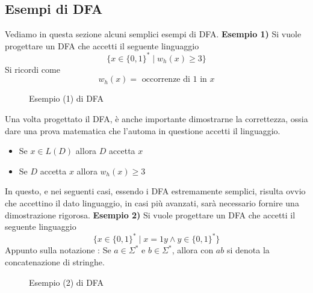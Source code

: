 \documentclass[10pt, letterpaper]{report}
\begin{document}
\subsection{Esempi di DFA}
Vediamo in questa sezione alcuni semplici esempi di DFA.\acc 
\textbf{Esempio 1)} Si vuole progettare un DFA che accetti il seguente linguaggio 
$$ \{x\in\{0,1\}^* \;|\;w_h(x)\ge 3 \}$$
Si ricordi come 
$$ w_h(x) = \text{ occorrenze di 1 in }x$$
\begin{figure}[h!]
    \centering
        \caption{Esempio (1) di DFA}
        \label{fig:DFAExample1}
\end{figure}
Una volta progettato il DFA, è anche importante dimostrarne la correttezza, ossia dare una prova 
matematica che l'automa in questione accetti il linguaggio.\begin{itemize}
    \item Se $x\in L(D)$ allora $D$ accetta $x$
    \item Se $D$ accetta $x$ allora $w_h(x)\ge 3$
\end{itemize}
In questo, e nei seguenti casi, essendo i DFA estremamente semplici, risulta ovvio che 
accettino il dato linguaggio, in casi più avanzati, sarà necessario fornire una dimostrazione 
rigorosa.\acc 
\textbf{Esempio 2)} Si vuole progettare un DFA che accetti il seguente linguaggio 
$$ \{x\in\{0,1\}^* \;|\;x=1y \land y \in  \{0,1\}^*\}$$
Appunto sulla notazione : Se $a\in \Sigma^*$ e $b\in \Sigma^*$, allora con $ab$ si 
denota la concatenazione di stringhe.\acc
\begin{figure}[h!]
    \centering
        \caption{Esempio (2) di DFA}
        \label{fig:DFAExample2}
\end{figure}\acc 
\end{document}

